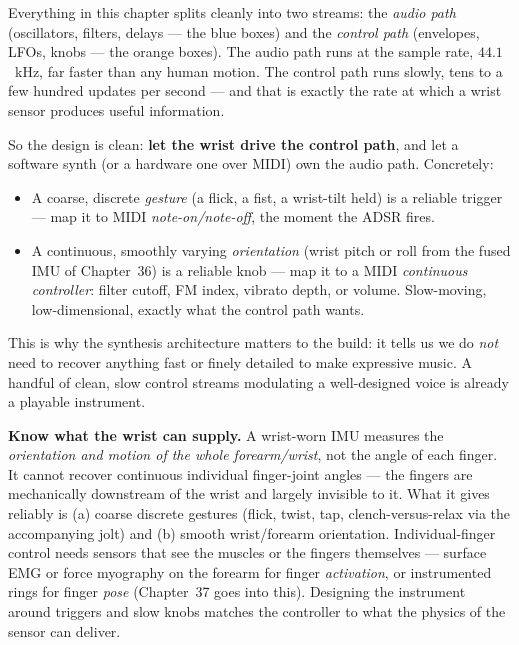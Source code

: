 \begin{goalbox}
Everything in this chapter splits cleanly into two streams: the \emph{audio path}
(oscillators, filters, delays --- the blue boxes) and the \emph{control path}
(envelopes, LFOs, knobs --- the orange boxes). The audio path runs at the sample
rate, $44.1$~kHz, far faster than any human motion. The control path runs slowly,
tens to a few hundred updates per second --- and that is exactly the rate at which
a wrist sensor produces useful information.

So the design is clean: \textbf{let the wrist drive the control path}, and let a
software synth (or a hardware one over MIDI) own the audio path. Concretely:
\begin{itemize}
  \item A coarse, discrete \emph{gesture} (a flick, a fist, a wrist-tilt held)
        is a reliable trigger --- map it to MIDI \emph{note-on/note-off}, the
        moment the ADSR fires.
  \item A continuous, smoothly varying \emph{orientation} (wrist pitch or roll
        from the fused IMU of Chapter~36) is a reliable knob --- map
        it to a MIDI \emph{continuous controller}: filter cutoff, FM index,
        vibrato depth, or volume. Slow-moving, low-dimensional, exactly what the
        control path wants.
\end{itemize}
This is why the synthesis architecture matters to the build: it tells us we do
\emph{not} need to recover anything fast or finely detailed to make expressive
music. A handful of clean, slow control streams modulating a well-designed voice
is already a playable instrument.
\end{goalbox}

\begin{trapbox}
\textbf{Know what the wrist can supply.} A wrist-worn IMU measures the
\emph{orientation and motion of the whole forearm/wrist}, not the angle of each
finger. It cannot recover continuous individual finger-joint angles --- the
fingers are mechanically downstream of the wrist and largely invisible to it.
What it gives reliably is (a) coarse discrete gestures (flick, twist, tap,
clench-versus-relax via the accompanying jolt) and (b) smooth wrist/forearm
orientation. Individual-finger control needs sensors that see the muscles or the
fingers themselves --- surface EMG or force myography on the forearm for finger
\emph{activation}, or instrumented rings for finger \emph{pose} (Chapter~37
goes into this). Designing the instrument around triggers and slow knobs
matches the controller to what the
physics of the sensor can deliver.
\end{trapbox}

